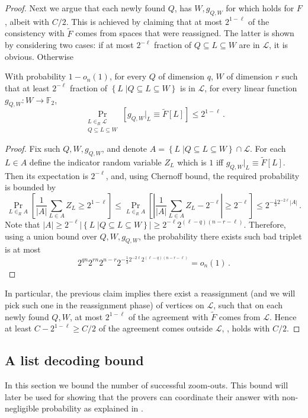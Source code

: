\documentclass{toc}
\newcommand\card[1]{\left| {#1} \right|}
\newcommand\sett[2]{\left\{ \left. #1 \;\right\vert #2 \right\}}
\newcommand\Prob[2]{{\Pr_{#1}\left[ {#2} \right]}}
\renewcommand\geq{\geqslant}
\renewcommand\leq{\leqslant}
\def\L{\mathcal{L}}
\def\F{\mathbb{F}}
\def\L{\mathcal{L}}
\begin{document}
\begin{proof}
Next we argue that each newly found $Q$, has $W,g_{Q,W}$ for which  holds for $F$,
albeit with $C/2$.
This is achieved by claiming that at most $2^{1-\ell}$ of the consistency with $\tilde{F}$ comes from spaces that were reassigned.
The latter is shown by considering two cases:
if at most $2^{-\ell}$ fraction of $Q\subseteq L\subseteq W$ are in $\L$, it is obvious. Otherwise
%
\begin{claim}
With probability $1-o_n(1)$, for every $Q$ of dimension $q$, $W$ of dimension $r$ such that at least $2^{-\ell}$ fraction of
$\sett{L}{Q\subseteq L\subseteq W}$ is in $\L$, for every linear function $g_{Q,W}\colon W\to\F_2$,
\[
\Prob{\substack{L\in_R \L \\ Q\subseteq L\subseteq W}}{g_{Q,W}|_L \equiv \tilde{F}[L]}\leq 2^{1-\ell}\,.
\]
\end{claim}
\begin{proof}
Fix such $Q,W,g_{Q,W}$, and denote $A = \sett{L}{Q\subseteq L\subseteq W}\cap \L$. For each $L\in A$ define the indicator
random variable $Z_L$ which is $1$ iff $g_{Q,W}|_L \equiv \tilde{F}[L]$. Then its expectation is $2^{-\ell}$, and, using Chernoff bound, the required
probability is bounded by
\[
\Prob{L\in_R A}{\frac{1}{\card{A}}\sum\limits_{L\in A}{Z_L}\geq 2^{1-\ell}}\leq
\Prob{L\in_R A}{\card{\frac{1}{\card{A}}\sum\limits_{L\in A}{Z_L}-2^{-\ell}}\geq 2^{-\ell}}\leq
2^{-\frac{1}{3}2^{-2\ell}\card{A}}\,.
\]
Note that $\card{A}\geq 2^{-\ell}\card{\sett{L}{Q\subseteq L\subseteq W}}\geq 2^{-\ell} 2^{(\ell-q)(n-r-\ell)}$.
Therefore, using a union bound over $Q,W,g_{Q,W}$, the probability there exists such bad triplet is at most
\[
2^{qn}2^{rn}2^{n-r}2^{-\frac{1}{3}2^{-2\ell}2^{(\ell-q)(n-r-\ell)}} = o_n(1)\,.
\]
\end{proof}

In particular, the previous claim implies there exist a reassignment (and we will pick such one
in the reassignment phase) of vertices on $\L$, such that on each newly found
$Q,W$, at most $2^{1-\ell}$ of the agreement with $\tilde{F}$ comes from $\L$. Hence at least $C-2^{1-\ell}\geq C/2$ of
the agreement comes outside $\L$, \ie,  holds with $C/2$.
\end{proof}




\subsection{A list decoding bound}
In this section we bound the number of successful zoom-outs. This
bound will later be used for showing that the provers can coordinate
their answer with non-negligible probability as explained in .
\end{document}
